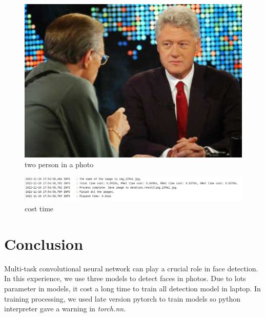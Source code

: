 \documentclass[journal, a4paper]{IEEEtran}
\begin{document}
	\begin{figure}
		\begin{center}
		\includegraphics[width=\columnwidth]{images/img_13869.jpg}
		\caption{two person in a photo}
		\label{fig:13869_raw}
		\end{center}
	\end{figure}
	\begin{figure}
		\begin{center}
		\includegraphics[width=\columnwidth]{images/cost.png}
		\caption{cost time}
		\label{fig:cost}
		\end{center}
	\end{figure}

\section{Conclusion}
	Multi-task convolutional neural network can play a crucial role in face detection. In this experience, we use three models to detect faces in photos. Due to lots parameter in models, it cost a long time to train all detection model in laptop. In training processing, we used late version pytorch to train models so python interpreter gave a warning in \textit{torch.nn}.

\printbibliography

\end{document}
